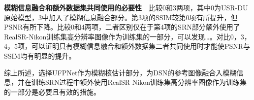 \noindent\textbf{模糊信息融合和额外数据集共同使用的必要性}\ \ 比较0和3两项，其中0为USR-DU原始模型，3中加入了模糊信息融合部分。第3项的SSIM较第0项有所提升，但PSNR有所下降。比较0和4两项，二者区别仅在于第4项的SRN部分额外使用了RealSR-Nikon训练集高分辨率图像作为训练集的一部分，可以发现\dots。对比0，3，4，5项，可以证明只有模糊信息融合和额外数据集二者共同使用时才能使PSNR与SSIM均有明显的提升。

综上所述，选择UFPNet作为模糊核估计部分，为DSN的参考图像融合入模糊信息，并在训练SRN过程中额外使用RealSR-Nikon训练集高分辨率图像作为训练集的一部分是必要且有效的措施。

